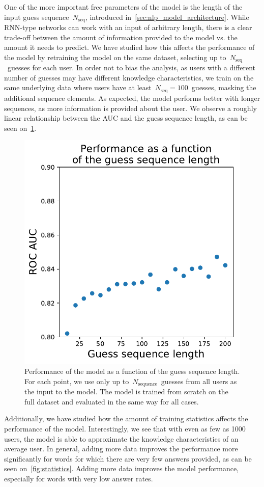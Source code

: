 One of the more important free parameters of the model is the length of the input guess sequence~$N_{\mathrm{seq}}$, introduced in~\cref{sec:nlp_model_architecture}. While RNN-type networks can work with an input of arbitrary length, there is a clear trade-off between the amount of information provided to the model vs. the amount it needs to predict.
We have studied how this affects the performance of the model by retraining the model on the same dataset, selecting up to~$N_{\mathrm{seq}}$~guesses for each user. In order not to bias the analysis, as users with a different number of guesses may have different knowledge characteristics, we train on the same underlying data where users have at least~$N_{\mathrm{seq}} = 100$~guesses, masking the additional sequence elements. As expected, the model performs better with longer sequences, as more information is provided about the user. We observe a roughly linear relationship between the AUC and the guess sequence length, as can be seen on~\cref{fig:seq_length}.

\begin{figure}[ht]
\centering
\includegraphics[width=0.5\linewidth]{figures/lingvist/seq_length.pdf}
\caption[Performance as a function of sequence length.]{Performance of the model as a function of the guess sequence length. For each point, we use only up to~$N_{\mathrm{sequence}}$~guesses from all users as the input to the model. The model is trained from scratch on the full dataset and evaluated in the same way for all cases.} 
\label{fig:seq_length} 
\end{figure} 

Additionally, we have studied how the amount of training statistics affects the performance of the model. Interestingly, we see that with even as few as 1000 users, the model is able to approximate the knowledge characteristics of an average user. In general, adding more data improves the performance more significantly for words for which there are very few answers provided, as can be seen on~\cref{fig:statistics}. Adding more data improves the model performance, especially for words with very low answer rates.

